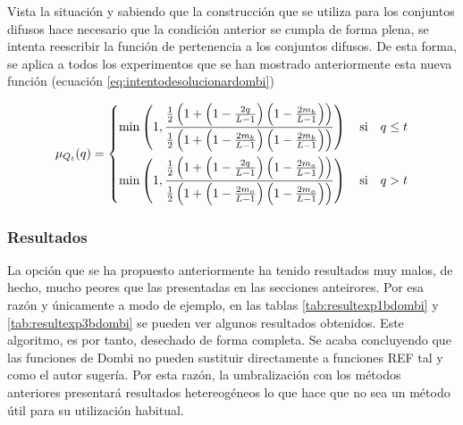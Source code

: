 \documentclass[main]{subfiles}
\begin{document}
Vista la situación y sabiendo que la construcción que se utiliza para los conjuntos difusos hace necesario que la condición anterior se cumpla de forma plena, se intenta reescribir la función de pertenencia a los conjuntos difusos. De esta forma, se aplica a todos los experimentos que se han mostrado anteriormente esta nueva función (ecuación \ref{eq:intentodesolucionardombi})

\begin{equation}\label{eq:intentodesolucionardombi}
    \mu_{Q_t}(q)=\left\{ \begin{split}
                 \min\left( 1, \frac
                    {\frac{1}{2} \left(1+\left(1-\frac{2q}{L-1}\right)\left(1-\frac{2m_b}{L-1}\right)\right)}
                    {\frac{1}{2} \left(1+\left(1-\frac{2m_b}{L-1}\right)\left(1-\frac{2m_b}{L-1}\right)\right)}\right)
                 \text{\quad si\quad} q\leq t\\
                 \min\left( 1, \frac
                    {\frac{1}{2} \left(1+\left(1-\frac{2q}{L-1}\right)\left(1-\frac{2m_o}{L-1}\right)\right)}
                    {\frac{1}{2} \left(1+\left(1-\frac{2m_o}{L-1}\right)\left(1-\frac{2m_o}{L-1}\right)\right)}\right)
                \text{\quad si\quad} q > t
                \end{split}\right.
\end{equation}



\subsubsection{Resultados}
La opción que se ha propuesto anteriormente ha tenido resultados muy malos, de hecho, mucho peores que las presentadas en las secciones anteirores. Por esa razón y únicamente a modo de ejemplo, en las tablas \ref{tab:resultexp1bdombi} y \ref{tab:resultexp3bdombi} se pueden ver algunos resultados obtenidos. Este algoritmo, es por tanto, desechado de forma completa. Se acaba concluyendo que las funciones de Dombi no pueden sustituir directamente a funciones REF tal y como el autor sugería. Por esta razón, la umbralización con los métodos anteriores presentará resultados hetereogéneos lo que hace que no sea un método útil para su utilización habitual.
\end{document}
